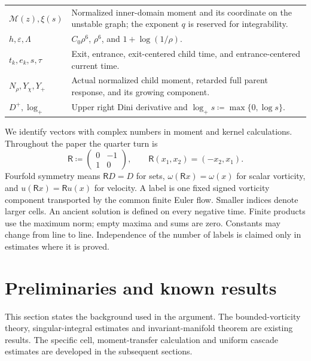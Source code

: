 \documentclass[11pt]{amsart}
\theoremstyle{remark}
\numberwithin{equation}{section}
\begin{document}
\begin{longtable}{@{}p{}p{}@{}}
$\mathcal M(z),\xi(s)$ & Normalized inner-domain moment and its coordinate on
the unstable graph; the exponent $q$ is reserved for integrability.\\
$h,\varepsilon,\Lambda$ & $C_0\rho^6$, $\rho^6$,
and $1+\log(1/\rho)$.\\
$t_k,e_k,s,\tau$ & Exit, entrance, exit-centered child time, and
entrance-centered current time.\\
$N_\rho,Y_\chi,Y_+$ & Actual normalized child moment, retarded full
parent response, and its growing component.\\
$D^+,\log_+$ & Upper right Dini derivative and
$\log_+s\coloneqq\max\{0,\log s\}$.\\
\end{longtable}
\endgroup

We identify vectors with complex numbers in moment and kernel
calculations. Throughout the paper the quarter turn is
\[
 \mathsf R\coloneqq\begin{pmatrix}0&-1\\1&0\end{pmatrix},\qquad
 \mathsf R(x_1,x_2)=(-x_2,x_1).
\] Fourfold symmetry means $\mathsf RD=D$ for sets,
$\omega(\mathsf Rx)=\omega(x)$ for scalar vorticity, and $u(\mathsf Rx)=\mathsf Ru(x)$
for velocity. A label is one fixed signed vorticity component transported
by the common finite Euler flow. Smaller indices denote larger cells.
An ancient solution is defined on every negative time.
Finite products use the maximum norm; empty maxima and sums are zero.
Constants may change from line to line. Independence of the number of
labels is claimed only in estimates where it is proved.

\section{Preliminaries and known results}\label{sec:preliminaries}
This section states the background used in the argument. The
bounded-vorticity theory, singular-integral estimates and
invariant-manifold theorem are existing results. The specific cell,
moment-transfer calculation and uniform cascade estimates are developed
in the subsequent sections.
\end{document}
